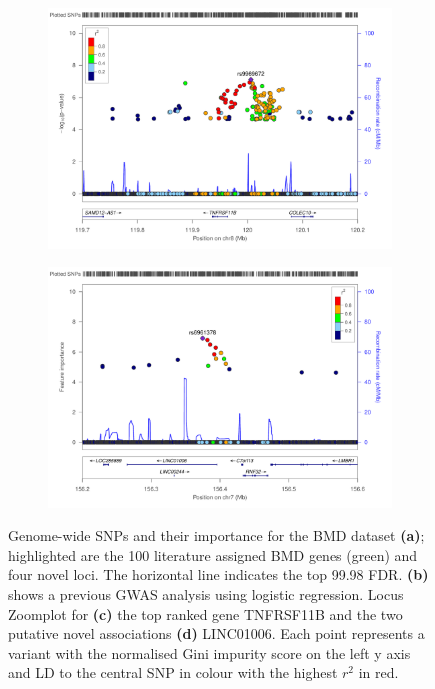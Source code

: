 \documentclass[10pt,letterpaper]{article}
\begin{document}
\begin{figure}[tbhp]
\begin{adjustwidth}{-2.00in}{0in}
\begin{subfigure}[b]{0.5\linewidth}
   \end{subfigure} 
    \begin{subfigure}[b]{0.5\linewidth}
    \includegraphics[totalheight=7cm]{./figs/new_10k_TNFRSF11B.pdf}
      \label{zoomplotprodh} 
    \end{subfigure} 
        \begin{subfigure}[b]{0.5\linewidth}
     \includegraphics[totalheight=7cm]{./figs/EUR_chr7_156_2-156_6mb.pdf}
      \label{zoomplotlinc} 
    \end{subfigure} 
    \begin{flushleft}
      Genome-wide SNPs and their importance for the BMD dataset {\bf(a)}; highlighted are the 100 literature assigned BMD genes (green) and four novel loci. The horizontal line indicates the top 99.98 FDR. 
      {\bf(b)} shows a previous GWAS analysis using logistic regression. 
      Locus Zoomplot for {\bf(c)} the top ranked gene TNFRSF11B and the two putative novel associations {\bf(d)} LINC01006. Each point represents a variant with the normalised Gini impurity score on the left y axis and LD to the central SNP in colour with the highest $r^2$ in red.
     \end{flushleft}
  \end{adjustwidth}
        \label{manhattenzoom} 
\end{figure}
\end{document}
